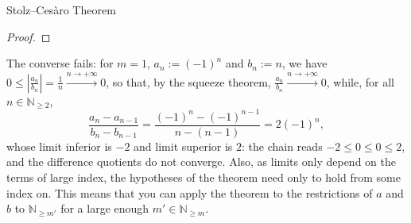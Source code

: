 \begin{appendixitem}{Stolz–Cesàro Theorem}
\begin{proof}
    \end{proof}
    \begin{remark}
        The converse fails: for \( m = 1 \), \( a_n := \left(-1\right)^n \) and \( b_n := n \), we have \( 0 \leq \left|\frac{a_n}{b_n}\right| = \frac{1}{n} \overset{n \to +\infty}{\longrightarrow} 0 \), so that, by the squeeze theorem, \( \frac{a_n}{b_n} \overset{n \to +\infty}{\longrightarrow} 0 \), while, for all \( n \in \mathbb{N}_{\geq 2} \),
        \[
            \frac{a_n-a_{n-1}}{b_n-b_{n-1}} = \frac{\left(-1\right)^n-\left(-1\right)^{n-1}}{n-\left(n-1\right)} = 2\left(-1\right)^n,
        \]
        whose limit inferior is \( -2 \) and limit superior is \( 2 \): the chain reads \( -2 \leq 0 \leq 0 \leq 2 \), and the difference quotients do not converge. Also, as limits only depend on the terms of large index, the hypotheses of the theorem need only to hold from some index on. This means that you can apply the theorem to the restrictions of \( a \) and \( b \) to \( \mathbb{N}_{\geq m'} \) for a large enough \( m' \in \mathbb{N}_{\geq m} \).
    \end{remark}
\end{appendixitem}
